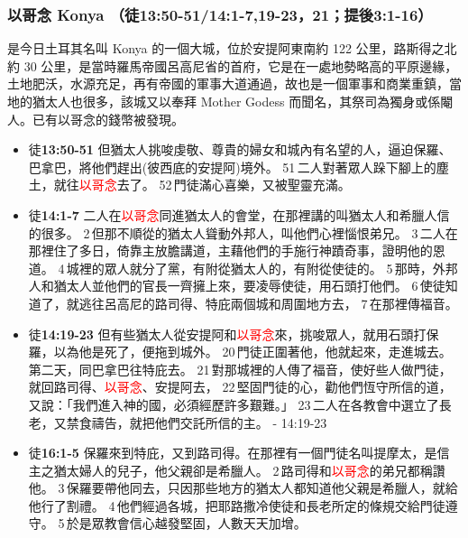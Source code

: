 \subsubsection{以哥念 Konya （徒13:50-51/14:1-7,19-23，21；提後\textbf{3:1-16}）}
是今日土耳其名叫 Konya 的一個大城，位於安提阿東南約 122 公里，路斯得之北約 30 公里，是當時羅馬帝國呂高尼省的首府，它是在一處地勢略高的平原邊緣，土地肥沃，水源充足，再有帝國的軍事大道通過，故也是一個軍事和商業重鎮，當地的猶太人也很多，該城又以奉拜 Mother Godess 而聞名，其祭司為獨身或係閹人。已有以哥念的錢幣被發現。

\begin{itemize}
\itemsep-.25em 
\item 徒\textbf{13:50-51} 但猶太人挑唆虔敬、尊貴的婦女和城內有名望的人，逼迫保羅、巴拿巴，將他們趕出(彼西底的安提阿)境外。 51 二人對著眾人跺下腳上的塵土，就往\textcolor{red}{以哥念}去了。 52 門徒滿心喜樂，又被聖靈充滿。
\item 徒\textbf{14:1-7} 二人在\textcolor{red}{以哥念}同進猶太人的會堂，在那裡講的叫猶太人和希臘人信的很多。 2 但那不順從的猶太人聳動外邦人，叫他們心裡惱恨弟兄。 3 二人在那裡住了多日，倚靠主放膽講道，主藉他們的手施行神蹟奇事，證明他的恩道。 4 城裡的眾人就分了黨，有附從猶太人的，有附從使徒的。 5 那時，外邦人和猶太人並他們的官長一齊擁上來，要凌辱使徒，用石頭打他們。 6 使徒知道了，就逃往呂高尼的路司得、特庇兩個城和周圍地方去， 7 在那裡傳福音。
\item 徒\textbf{14:19-23} 但有些猶太人從安提阿和\textcolor{red}{以哥念}來，挑唆眾人，就用石頭打保羅，以為他是死了，便拖到城外。 20 門徒正圍著他，他就起來，走進城去。第二天，同巴拿巴往特庇去。 21 對那城裡的人傳了福音，使好些人做門徒，就回路司得、\textcolor{red}{以哥念}、安提阿去， 22 堅固門徒的心，勸他們恆守所信的道，又說：「我們進入神的國，必須經歷許多艱難。」 23 二人在各教會中選立了長老，又禁食禱告，就把他們交託所信的主。 - 14:19-23
\item 徒\textbf{16:1-5} 保羅來到特庇，又到路司得。在那裡有一個門徒名叫提摩太，是信主之猶太婦人的兒子，他父親卻是希臘人。 2 路司得和\textcolor{red}{以哥念}的弟兄都稱讚他。 3 保羅要帶他同去，只因那些地方的猶太人都知道他父親是希臘人，就給他行了割禮。 4 他們經過各城，把耶路撒冷使徒和長老所定的條規交給門徒遵守。 5 於是眾教會信心越發堅固，人數天天加增。

\end{itemize}
